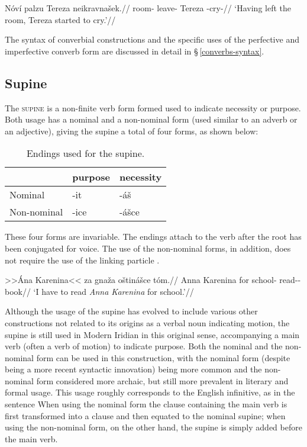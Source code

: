 \pex
\begingl
\gla Nóví palzu Tereza neikravnašek.//
\glb room-\Gen{} leave- Tereza -cry-//
\glft `Having left the room, Tereza started to cry.'//
\endgl
\xe

The syntax of converbial constructions and the specific uses of the perfective
and imperfective converb form are discussed in detail in
\S\,\ref{converbs-syntax}.


\subsection{Supine}

The {\scshape supine} is a non-finite verb form formed used to
indicate necessity or purpose. Both usage has a nominal and a non-nominal form
(used similar to an adverb or an adjective), giving the supine a total of four
forms, as shown below:

\begin{table}[ht!]
	\sffamily\footnotesize
	\caption{Endings used for the supine.}
	\medskip
	\begin{tabu} to 0.6
		\toprule
		&{\sc purpose}&{\sc necessity}\\
		\midrule
		Nominal & {-it} & {-áš}\\
		Non-nominal & {-ice} & {-ášce}\\
		\bottomrule
	\end{tabu}
\end{table}

These four forms are invariable. The endings attach to the verb after the root
has been conjugated for voice. The use of the non-nominal forms, in addition,
does not require the use of the linking particle .

\pex
\begingl
\gla >>Ána Karenina<< za gnaža oštinášce tóm.//
\glb Anna Karenina for school-\Acc{} read-\Pv{}-\SupN{} book//
\glft `I have to read \textit{Anna Karenina} for school.'//
\endgl
\xe

Although the usage of the supine has evolved to include various other
constructions not related to its origins as a verbal noun indicating motion, the
supine is still used in Modern Iridian in this original sense, accompanying a
main verb (often a verb of motion) to indicate purpose. Both the nominal and the
non-nominal form can be used in this construction, with the nominal form
(despite being a more recent syntactic innovation) being more common and the
non-nominal form considered more archaic, but still more prevalent in literary
and formal usage. This usage roughly corresponds to the English infinitive, as
in the sentence  When using the nominal
form the clause containing the main verb is first transformed into a
clause and then equated to the nominal supine; when using the
non-nominal form, on the other hand, the supine is simply added before the main
verb.

